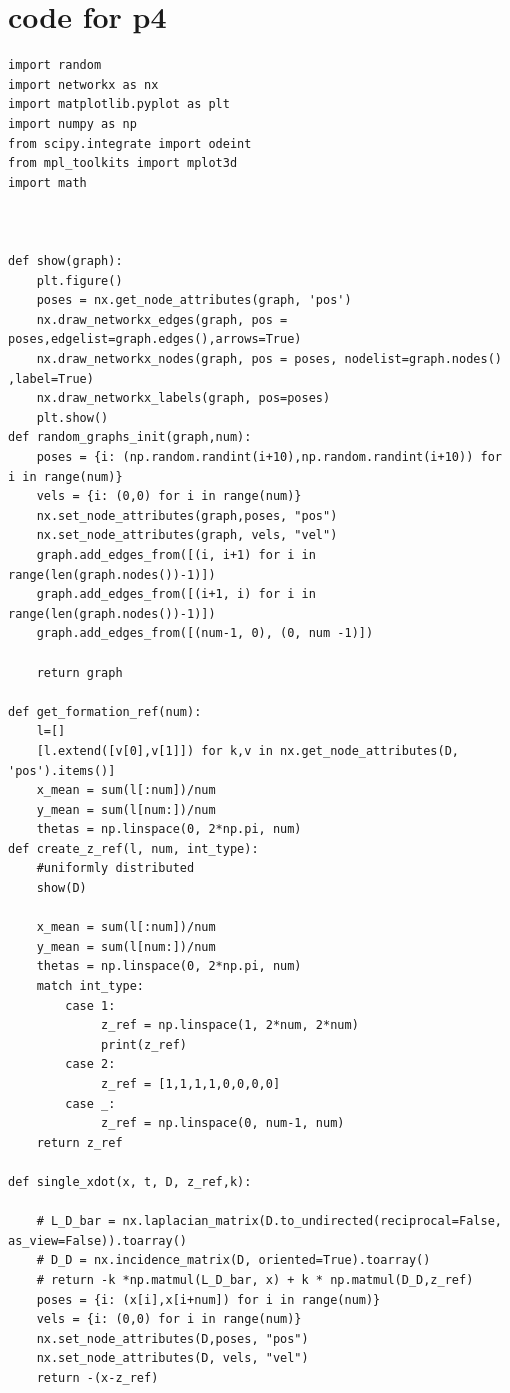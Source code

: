 \documentclass{article}
\begin{document}
\section*{code for p4}
\begin{verbatim}
import random
import networkx as nx
import matplotlib.pyplot as plt
import numpy as np
from scipy.integrate import odeint
from mpl_toolkits import mplot3d
import math



def show(graph): 
    plt.figure()
    poses = nx.get_node_attributes(graph, 'pos')
    nx.draw_networkx_edges(graph, pos = poses,edgelist=graph.edges(),arrows=True)
    nx.draw_networkx_nodes(graph, pos = poses, nodelist=graph.nodes() ,label=True)
    nx.draw_networkx_labels(graph, pos=poses)
    plt.show()
def random_graphs_init(graph,num):
    poses = {i: (np.random.randint(i+10),np.random.randint(i+10)) for i in range(num)}
    vels = {i: (0,0) for i in range(num)}
    nx.set_node_attributes(graph,poses, "pos")
    nx.set_node_attributes(graph, vels, "vel")
    graph.add_edges_from([(i, i+1) for i in range(len(graph.nodes())-1)])
    graph.add_edges_from([(i+1, i) for i in range(len(graph.nodes())-1)])
    graph.add_edges_from([(num-1, 0), (0, num -1)])

    return graph

def get_formation_ref(num):
    l=[]
    [l.extend([v[0],v[1]]) for k,v in nx.get_node_attributes(D, 'pos').items()]
    x_mean = sum(l[:num])/num
    y_mean = sum(l[num:])/num
    thetas = np.linspace(0, 2*np.pi, num)
def create_z_ref(l, num, int_type):
    #uniformly distributed
    show(D)

    x_mean = sum(l[:num])/num
    y_mean = sum(l[num:])/num
    thetas = np.linspace(0, 2*np.pi, num)
    match int_type:
        case 1:
             z_ref = np.linspace(1, 2*num, 2*num)
             print(z_ref)
        case 2:
             z_ref = [1,1,1,1,0,0,0,0]
        case _:
             z_ref = np.linspace(0, num-1, num)
    return z_ref

def single_xdot(x, t, D, z_ref,k):

    # L_D_bar = nx.laplacian_matrix(D.to_undirected(reciprocal=False, as_view=False)).toarray()
    # D_D = nx.incidence_matrix(D, oriented=True).toarray()
    # return -k *np.matmul(L_D_bar, x) + k * np.matmul(D_D,z_ref)
    poses = {i: (x[i],x[i+num]) for i in range(num)}
    vels = {i: (0,0) for i in range(num)}
    nx.set_node_attributes(D,poses, "pos")
    nx.set_node_attributes(D, vels, "vel")
    return -(x-z_ref)


\end{verbatim}
\end{document}

